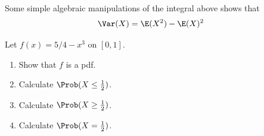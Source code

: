 \documentclass[twoside]{book}\usepackage[]{graphicx}\usepackage[]{xcolor}
\begin{document}
Some simple algebraic manipulations of the integral above shows that
\begin{align}
\Var(X) &= \E(X^2) - \E(X)^2
\label{eqn:varshortcut}
\end{align}

\begin{problem} 
Let $f(x) = 5/4 - x^3$  on $[0,1]$.  

\begin{enumerate}
	\item
		Show that $f$ is a pdf.
	\item
			Calculate $\Prob(X \le \frac12)$.
	\item
			Calculate $\Prob(X \ge \frac12)$.
	\item
			Calculate $\Prob(X = \frac12)$.
\end{enumerate}

\end{problem}
\end{document}
